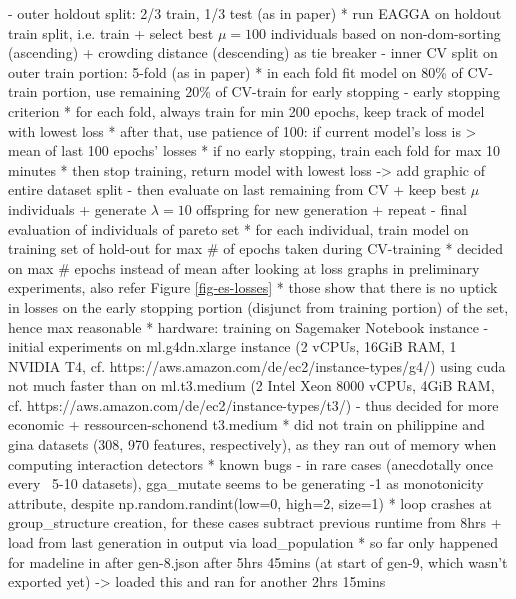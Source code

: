 \documentclass[twoside,11pt]{article}
\begin{document}
    - outer holdout split: 2/3 train, 1/3 test (as in paper)
      * run EAGGA on holdout train split, i.e. train + select best $\mu=100$ individuals based on non-dom-sorting (ascending) + crowding distance (descending) as tie breaker
    - inner CV split on outer train portion: 5-fold (as in paper)
      * in each fold fit model on 80\% of CV-train portion, use remaining 20\% of CV-train for early stopping
    - early stopping criterion
      * for each fold, always train for min 200 epochs, keep track of model with lowest loss
      * after that, use patience of 100: if current model's loss is > mean of last 100 epochs' losses
      * if no early stopping, train each fold for max 10 minutes
      * then stop training, return model with lowest loss
    -> add graphic of entire dataset split
    - then evaluate on last remaining from CV + keep best $\mu$ individuals + generate $\lambda=10$ offspring for new generation + repeat
    - final evaluation of individuals of pareto set
      * for each individual, train model on training set of hold-out for max \# of epochs taken during CV-training
      * decided on max \# epochs instead of mean after looking at loss graphs in preliminary experiments, also refer Figure \ref{fig-es-losses}
      * those show that there is no uptick in losses on the early stopping portion (disjunct from training portion) of the set, hence max reasonable
  * hardware: training on Sagemaker Notebook instance
    - initial experiments on ml.g4dn.xlarge instance (2 vCPUs, 16GiB RAM, 1 NVIDIA T4, cf. https://aws.amazon.com/de/ec2/instance-types/g4/)
    using cuda not much faster than on ml.t3.medium (2 Intel Xeon 8000 vCPUs, 4GiB RAM, cf. https://aws.amazon.com/de/ec2/instance-types/t3/)
    - thus decided for more economic + ressourcen-schonend t3.medium
  * did not train on philippine and gina datasets (308, 970 features, respectively), as they ran out of memory when computing interaction detectors
  * known bugs
    - in rare cases (anecdotally once every ~5-10 datasets), gga\_mutate seems to be generating -1 as monotonicity attribute, despite np.random.randint(low=0, high=2, size=1)
      * loop crashes at group\_structure creation, for these cases subtract previous runtime from 8hrs + load from last generation in output via load\_population
      * so far only happened for madeline in after gen-8.json after 5hrs 45mins (at start of gen-9, which wasn't exported yet) -> loaded this and ran for another 2hrs 15mins
\end{document}
